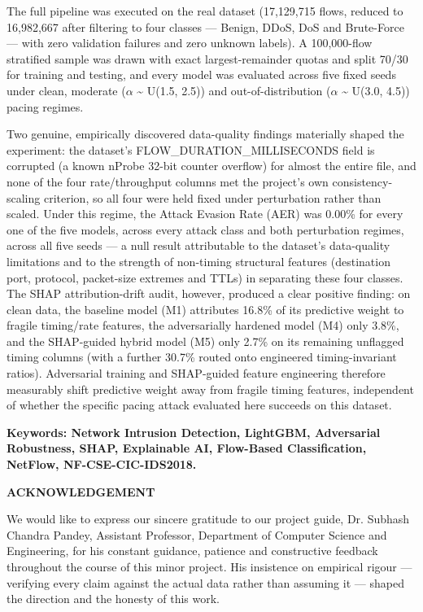 \documentclass[12pt,a4paper]{report}
\begin{document}
The full pipeline was executed on the real dataset (17,129,715 flows, reduced to 16,982,667 after filtering to four classes --- Benign, DDoS, DoS and Brute-Force --- with zero validation failures and zero unknown labels). A 100,000-flow stratified sample was drawn with exact largest-remainder quotas and split 70/30 for training and testing, and every model was evaluated across five fixed seeds under clean, moderate ($\alpha$ \textasciitilde{} U(1.5, 2.5)) and out-of-distribution ($\alpha$ \textasciitilde{} U(3.0, 4.5)) pacing regimes.

Two genuine, empirically discovered data-quality findings materially shaped the experiment: the dataset's FLOW\_DURATION\_MILLISECONDS field is corrupted (a known nProbe 32-bit counter overflow) for almost the entire file, and none of the four rate/throughput columns met the project's own consistency-scaling criterion, so all four were held fixed under perturbation rather than scaled. Under this regime, the Attack Evasion Rate (AER) was 0.00\% for every one of the five models, across every attack class and both perturbation regimes, across all five seeds --- a null result attributable to the dataset's data-quality limitations and to the strength of non-timing structural features (destination port, protocol, packet-size extremes and TTLs) in separating these four classes. The SHAP attribution-drift audit, however, produced a clear positive finding: on clean data, the baseline model (M1) attributes 16.8\% of its predictive weight to fragile timing/rate features, the adversarially hardened model (M4) only 3.8\%, and the SHAP-guided hybrid model (M5) only 2.7\% on its remaining unflagged timing columns (with a further 30.7\% routed onto engineered timing-invariant ratios). Adversarial training and SHAP-guided feature engineering therefore measurably shift predictive weight away from fragile timing features, independent of whether the specific pacing attack evaluated here succeeds on this dataset.

\textbf{Keywords: Network Intrusion Detection, LightGBM, Adversarial Robustness, SHAP, Explainable AI, Flow-Based Classification, NetFlow, NF-CSE-CIC-IDS2018.}


\newpage

\begin{center}\textbf{ACKNOWLEDGEMENT}\end{center}\vspace{4pt}
We would like to express our sincere gratitude to our project guide, Dr. Subhash Chandra Pandey, Assistant Professor, Department of Computer Science and Engineering, for his constant guidance, patience and constructive feedback throughout the course of this minor project. His insistence on empirical rigour --- verifying every claim against the actual data rather than assuming it --- shaped the direction and the honesty of this work.
\end{document}
